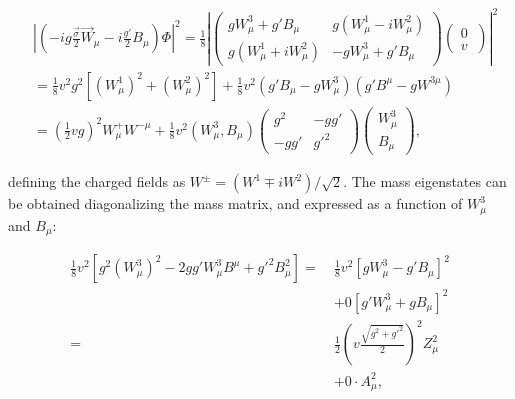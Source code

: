 \begin{equation}
  \begin{split}
    & \left|\left(-ig\frac{\vec \sigma}{2}\vec{W}_\mu - i\frac{g'}{2}B_\mu \right)\Phi\right|^2 
    = \frac{1}{8} \left|\left(
    \begin{matrix}
      gW_\mu^3 + g'B_\mu & g(W_\mu^1 - iW_\mu^2) \\
      g(W_\mu^1 + iW_\mu^2) & -gW_\mu^3 + g'B_\mu 
    \end{matrix}
    \right)
    \left(
    \begin{matrix}
      0 \\%
      v   \
    \end{matrix}
    \right) \right|^2 \\
    &= \frac{1}{8} v^2 g^2 \left[(W_\mu^1)^2 + (W_\mu^2)^2\right] + \frac{1}{8} v^2 (g'B_\mu - gW_\mu^3)(g'B^\mu - gW^{3\mu}) \\
    &= \left(\frac{1}{2}vg\right)^2 W_\mu^{+} W^{-\mu} + \frac{1}{8} v^2 \left(W_\mu^3, B_\mu\right) 
    \left(
    \begin{matrix}
      g^2 & -gg' \\
      -gg' & g'^2
    \end{matrix}
    \right)
    \left(
    \begin{matrix}
      W_\mu^3 \\
      B_\mu
    \end{matrix}
    \right),
  \end{split}
  \label{eq:HiggsBosonMassDemonstration}
\end{equation}

\noindent defining the charged fields as $W^{\pm} = (W^1 \mp iW^2)/\sqrt{2}$. The mass eigenstates can be obtained diagonalizing the mass matrix, and expressed as a function of $W_\mu^3$ and $B_\mu$:

\begin{equation}
\begin{split}
    \frac{1}{8}v^2\left[g^2\left(W_\mu^3\right)^2 - 2gg'W_\mu^3 B^\mu + g'^2B_\mu^2\right] 
    =\ & \frac{1}{8}v^2\left[ gW_\mu^3 - g'B_\mu\right]^2           \\
    &+ 0 \left[g'W_\mu^3 + gB_\mu\right]^2 \\
    =\ & \frac{1}{2}\left(v\frac{\sqrt{g^2+g'^2}}2\right)^2 Z_\mu^2 \\
    &+ 0 \cdot A_\mu^2, 
\end{split}
  \label{eq:HiggsBosonMassDemonstration2}
\end{equation}


